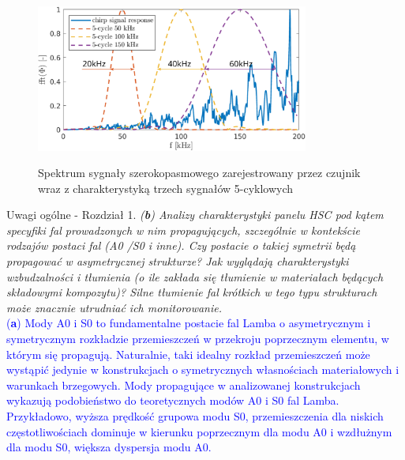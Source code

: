 \documentclass[10pt,aspectratio=169]{beamer} %
\begin{document}
\begin{frame}
	\begin{figure}
		\centering
		\caption{Spektrum sygnały szerokopasmowego zarejestrowany przez czujnik wraz z charakterystyką trzech sygnałów 5-cyklowych}
		\includegraphics[width=0.8\textwidth]{figs/sensor_response_frequency_domain}
		\label{fig:signal_spectrum}
	\end{figure}
\end{frame}
\begin{frame}[label=frame2]{Uwagi ogólne - Rozdział 1.}\justifying
\textit{(\textbf{b}) Analizy charakterystyki panelu HSC pod kątem specyfiki fal prowadzonych w nim propagujących, szczególnie w kontekście rodzajów postaci fal (A0 /S0 i inne). Czy postacie o takiej symetrii będą propagować w asymetrycznej strukturze? Jak wyglądają charakterystyki wzbudzalności i tłumienia (o ile zakłada się tłumienie w materiałach będących składowymi kompozytu)? Silne tłumienie fal krótkich w tego typu strukturach może znacznie utrudniać ich monitorowanie.}\\
\textcolor{blue}{(\textbf{a}) Mody A0 i S0 to fundamentalne postacie fal Lamba o asymetrycznym i symetrycznym rozkładzie przemieszczeń w przekroju poprzecznym elementu, w którym się propagują. Naturalnie, taki idealny rozkład przemieszczeń może wystąpić jedynie w konstrukcjach o symetrycznych własnościach materiałowych i warunkach brzegowych. Mody propagujące w analizowanej konstrukcjach wykazują podobieństwo do teoretycznych modów A0 i S0 fal Lamba. Przykładowo, wyższa prędkość grupowa modu S0, przemieszczenia dla niskich częstotliwościach dominuje w kierunku poprzecznym dla modu A0 i wzdłużnym dla modu S0, większa dyspersja modu A0.}
\end{frame}
\end{document}
